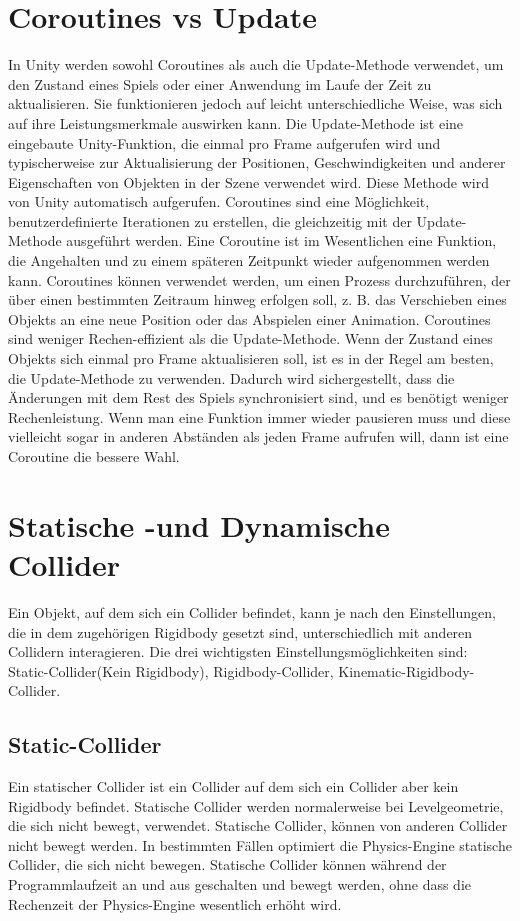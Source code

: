 \section{Coroutines vs Update}
In Unity werden sowohl Coroutines als auch die Update-Methode verwendet, um den Zustand eines Spiels oder einer Anwendung im Laufe der Zeit zu aktualisieren. Sie funktionieren jedoch auf leicht unterschiedliche Weise, was sich auf ihre Leistungsmerkmale auswirken kann. Die Update-Methode ist eine eingebaute Unity-Funktion, die einmal pro Frame aufgerufen wird und typischerweise zur Aktualisierung der Positionen, Geschwindigkeiten und anderer Eigenschaften von Objekten in der Szene verwendet wird. Diese Methode wird von Unity automatisch aufgerufen. Coroutines sind eine Möglichkeit, benutzerdefinierte Iterationen zu erstellen, die gleichzeitig mit der Update-Methode ausgeführt werden. Eine Coroutine ist im Wesentlichen eine Funktion, die Angehalten und zu einem späteren Zeitpunkt wieder aufgenommen werden kann. Coroutines können verwendet werden, um einen Prozess durchzuführen, der über einen bestimmten Zeitraum hinweg erfolgen soll, z. B. das Verschieben eines Objekts an eine neue Position oder das Abspielen einer Animation. Coroutines sind weniger Rechen-effizient als die Update-Methode. Wenn der Zustand eines Objekts sich einmal pro Frame aktualisieren soll, ist es in der Regel am besten, die Update-Methode zu verwenden. Dadurch wird sichergestellt, dass die Änderungen mit dem Rest des Spiels synchronisiert sind, und es benötigt weniger Rechenleistung. Wenn man eine Funktion immer wieder pausieren muss und diese vielleicht sogar in anderen Abständen als jeden Frame aufrufen will, dann ist eine Coroutine die bessere Wahl.
\cite{_dickinson2015unity}

\section{Statische -und Dynamische Collider}
Ein Objekt, auf dem sich ein Collider befindet, kann je nach den Einstellungen, die in dem zugehörigen Rigidbody gesetzt sind, unterschiedlich mit anderen Collidern interagieren. Die drei wichtigsten Einstellungsmöglichkeiten sind: Static-Collider(Kein Rigidbody), Rigidbody-Collider, Kinematic-Rigidbody-Collider.
\cite{_staticCollider}

\subsection{Static-Collider}
Ein statischer Collider ist ein Collider auf dem sich ein Collider aber kein Rigidbody befindet. Statische Collider werden normalerweise bei Levelgeometrie, die sich nicht bewegt, verwendet. Statische Collider, können von anderen Collider nicht bewegt werden. In bestimmten Fällen optimiert die Physics-Engine statische Collider, die sich nicht bewegen. Statische Collider können während der Programmlaufzeit an und aus geschalten und bewegt werden, ohne dass die Rechenzeit der Physics-Engine wesentlich erhöht wird.
\cite{_staticCollider}

